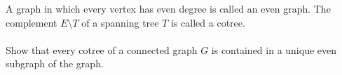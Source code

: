 \documentclass{article}
\begin{document}
\begin{exercise}
A graph in which every vertex has even degree is called an even graph. The complement $E\setminus T$ of a spanning tree $T$ is called a cotree.
\paragraph{}
Show that every cotree of a connected graph $G$ is contained in a unique even subgraph of the graph.
\begin{answer}

\end{answer}
\end{exercise}
\end{document}
